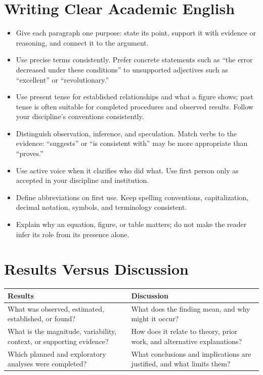 \documentclass[12pt,a4paper,oneside]{report}
\begin{document}
\section{Writing Clear Academic English}
\begin{itemize}
\item Give each paragraph one purpose: state its point, support it with
evidence or reasoning, and connect it to the argument.
\item Use precise terms consistently. Prefer concrete statements such as
``the error decreased under these conditions'' to unsupported adjectives
such as ``excellent'' or ``revolutionary.''
\item Use present tense for established relationships and what a figure
shows; past tense is often suitable for completed procedures and observed
results. Follow your discipline's conventions consistently.
\item Distinguish observation, inference, and speculation. Match verbs to
the evidence: ``suggests'' or ``is consistent with'' may be more appropriate
than ``proves.''
\item Use active voice when it clarifies who did what. Use first person only
as accepted in your discipline and institution.
\item Define abbreviations on first use. Keep spelling conventions,
capitalization, decimal notation, symbols, and terminology consistent.
\item Explain why an equation, figure, or table matters; do not make the
reader infer its role from its presence alone.
\end{itemize}

\section{Results Versus Discussion}
\noindent\begin{tabularx}{\textwidth}{@{}YY@{}}
\toprule Results & Discussion\\\midrule
What was observed, estimated, established, or found? & What does the
finding mean, and why might it occur?\\
What is the magnitude, variability, context, or supporting evidence? & How
does it relate to theory, prior work, and alternative explanations?\\
Which planned and exploratory analyses were completed? & What conclusions
and implications are justified, and what limits them?\\
\bottomrule
\end{tabularx}
\end{document}
